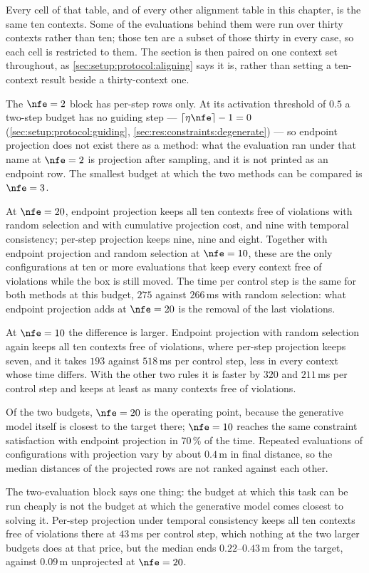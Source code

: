 Every cell of that table, and of every other alignment table in this chapter, is the same ten contexts.
Some of the evaluations behind them were run over thirty contexts rather than ten; those ten are a subset
of those thirty in every case, so each cell is restricted to them. The section is then paired on one
context set throughout, as \autoref{sec:setup:protocol:aligning} says it is, rather than setting a
ten-context result beside a thirty-context one.

The $\nfe=2$ block has per-step rows only. At its activation threshold of $0.5$ a two-step budget has no
guiding step --- $\lceil \eta\nfe\rceil - 1 = 0$ (\autoref{sec:setup:protocol:guiding},
\autoref{sec:res:constraints:degenerate}) --- so endpoint projection does not exist there as a method: what
the evaluation ran under that name at $\nfe=2$ is projection after sampling, and it is not printed as an
endpoint row. The smallest budget at which the two methods can be compared is $\nfe=3$.

At $\nfe=20$, endpoint projection keeps all ten contexts free of violations with random selection and
with cumulative projection cost, and nine with temporal consistency; per-step projection keeps nine, nine
and eight. Together with endpoint projection and random selection at $\nfe=10$, these are the only
configurations at ten or more evaluations that keep every context free of violations while the box is
still moved.
The time per control step is the same for both methods at this budget, $275$ against $266$\,ms with random
selection: what endpoint projection adds at $\nfe=20$ is the removal of the last violations.

At $\nfe=10$ the difference is larger. Endpoint projection with random selection again keeps all ten
contexts free of violations, where per-step projection keeps seven, and it takes $193$ against $518$\,ms
per control step, less in every context whose time differs. With the other two rules it is faster by
$320$ and $211$\,ms per control step and keeps at least as many contexts free of violations.

Of the two budgets, $\nfe=20$ is the operating point, because the generative model itself is closest to
the target there; $\nfe=10$ reaches the same constraint satisfaction with endpoint projection in
$70\,\%$ of the time.
Repeated evaluations of configurations with projection vary by about $0.4$\,m in final
distance, so the median distances of the projected rows are not ranked against each other.

The two-evaluation block says one thing: the budget at which this task can be run cheaply is not the
budget at which the generative model comes closest to solving it. Per-step projection under temporal consistency keeps all
ten contexts free of violations there at $43$\,ms per control step, which nothing at the two larger
budgets does at that price, but the median ends $0.22$--$0.43$\,m from the target, against $0.09$\,m
unprojected at $\nfe=20$.

